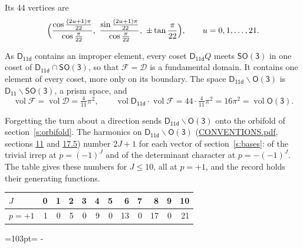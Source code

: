 \documentclass[10pt,a4paper]{article}
\newcommand{\needspace}[1]{\par\penalty-100\begingroup\dimen0=#1\relax\dimen2=\pagegoal
  \advance\dimen2-\pagetotal\ifdim\dimen0>\dimen2\relax\ifdim\dimen2>0pt\vfil\break\fi\fi
  \endgroup}
\numberwithin{equation}{section}
\newcommand{\grp}[1]{\mathsf{#1}}
\newcommand{\vol}{\operatorname{vol}}
\newcommand{\fcell}{\mathcal{D}}
\newcommand{\fdomain}{\mathcal{F}}
\begin{document}
\leavevmode\label{n:local.vertex.u}Its 44 vertices are
\begin{equation}\label{e:prism}\Bigl(\frac{\cos\frac{(2u+1)\pi}{22}}{\cos\frac{\pi}{22}},\ \frac{\sin\frac{(2u+1)\pi}{22}}{\cos\frac{\pi}{22}},\ \pm\tan\frac{\pi}{22}\Bigr),\qquad u = 0, 1, \dots, 21.\end{equation}

\leavevmode\label{n:set.fundamental}As $\grp{D_{11d}}$ contains an improper element, every coset $\grp{D_{11d}}Q$ meets \href{SO3.pdf}{$\grp{SO(3)}$} in one coset of $\grp{D_{11d}} \cap \grp{SO(3)}$, so that $\fdomain = \fcell$ is a fundamental domain. It contains one element of every coset, more only on its boundary.
The space $\grp{D_{11d}}\backslash\grp{O(3)}$ is $\grp{D_{11}}\backslash\grp{SO(3)}$, a prism space, and
\begin{equation}\label{e:volume}\vol\fdomain = \vol\fcell = \tfrac{4}{11}\pi^2,\qquad \vol\grp{D_{11d}}\cdot\vol\fdomain = 44\cdot \tfrac{4}{11}\pi^2 = 16\pi^2 = \vol\grp{O(3)}.\end{equation}

Forgetting the turn about a direction sends $\grp{D_{11d}}\backslash\grp{O(3)}$ onto the orbifold of section~\ref{s:orbifold}.
The harmonics on $\grp{D_{11d}}\backslash\grp{O(3)}$ (\href{../../CONVENTIONS.pdf}{CONVENTIONS.pdf}, sections \href{../../CONVENTIONS.pdf\#conv.11}{11} and \href{../../CONVENTIONS.pdf\#conv.17.5}{17.5}) number $2J + 1$ for each vector of section~\ref{s:bases}: of the trivial irrep at $p = (-1)^J$ and of the determinant character at $p = -(-1)^J$. The table gives these numbers for $J \le 10$, all at $p = +1$, and the record holds their generating functions.
{\small\setlength{\tabcolsep}{4pt}\begin{longtable}{@{}lrrrrrrrrrrr@{}}\toprule
$J$ & 0 & 1 & 2 & 3 & 4 & 5 & 6 & 7 & 8 & 9 & 10\\\midrule\endhead
\bottomrule\endfoot\endlastfoot
$p = +1$ & 1 & 0 & 5 & 0 & 9 & 0 & 13 & 0 & 17 & 0 & 21\\
\bottomrule\end{longtable}}
\needspace{103pt}
\end{document}
